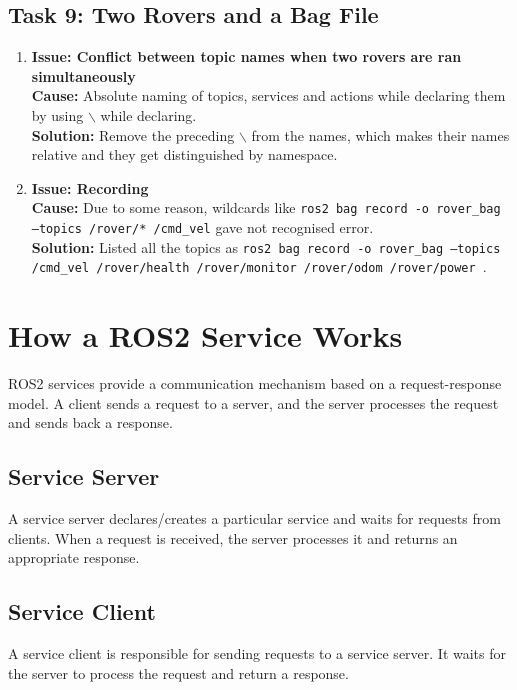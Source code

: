 \documentclass[12pt,a4paper]{article}
\begin{document}
\subsection{Task 9: Two Rovers and a Bag File}
\begin{enumerate}[leftmargin=*]
    \item \textbf{Issue: Conflict between topic names when two rovers are ran simultaneously}\\
    \textbf{Cause:} Absolute naming of topics, services and actions while declaring them by using \texttt{$\backslash$} while declaring.\\
    \textbf{Solution:} Remove the preceding \texttt{$\backslash$} from the names, which makes their names relative and they get distinguished by namespace.

    \item \textbf{Issue: Recording}\\
    \textbf{Cause:} Due to some reason, wildcards like \texttt{ros2 bag record -o rover\_bag --topics /rover/* /cmd\_vel} gave not recognised error.\\
    \textbf{Solution:} Listed all the topics as \texttt{ros2 bag record -o rover\_bag --topics /cmd\_vel /rover/health /rover/monitor /rover/odom /rover/power }.
\end{enumerate}

\section{How a ROS2 Service Works}
ROS2 services provide a communication mechanism based on a request-response model. A client sends a request to a server, and the server processes the request and sends back a response.

\subsection{Service Server}
A service server declares/creates a particular service and waits for requests from clients. When a request is received, the server processes it and returns an appropriate response.

\subsection{Service Client}
A service client is responsible for sending requests to a service server. It waits for the server to process the request and return a response.
\end{document}
